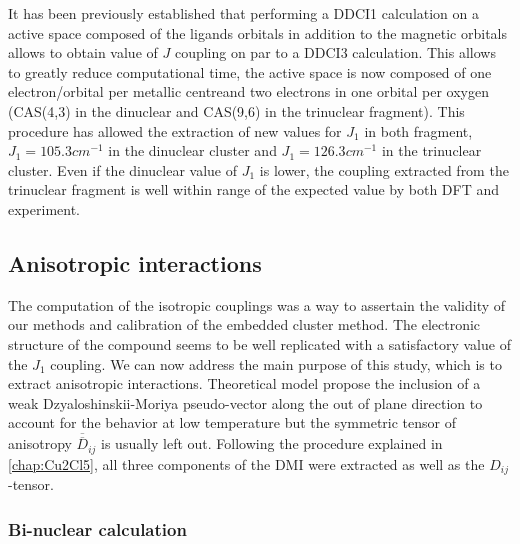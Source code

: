 \documentclass[10pt]{report}
\numberwithin{equation}{section}
\begin{document}
It has been previously established that performing a DDCI1 calculation on a active space composed of the ligands orbitals in addition to the magnetic orbitals allows to obtain value of $J$ coupling on par to a DDCI3 calculation.
This allows to greatly reduce computational time, the active space is now composed of one electron/orbital per metallic centreand two electrons in one orbital per oxygen (CAS(4,3) in the dinuclear and CAS(9,6) in the trinuclear fragment).
This procedure has allowed the extraction of new values for $J_1$ in both fragment, $J_1=105.3 cm^{-1}$ in the dinuclear cluster and $J_1=126.3 cm^{-1}$ in the trinuclear cluster.
Even if the dinuclear value of $J_1$ is lower, the coupling extracted from the trinuclear fragment is well within range of the expected value by both DFT and experiment.




\subsection{Anisotropic interactions}

The computation of the isotropic couplings was a way to assertain the validity of our methods and calibration of the embedded cluster method.
The electronic structure of the compound seems to be well replicated with a satisfactory value of the $J_1$ coupling.
We can now address the main purpose of this study, which is to extract anisotropic interactions.
Theoretical model propose the inclusion of a weak Dzyaloshinskii-Moriya pseudo-vector along the out of plane direction to account for the behavior at low temperature but the symmetric tensor of anisotropy $\overline{\overline{D}}_{ij}$ is usually left out.
Following the procedure explained in \ref{chap:Cu2Cl5}, all three components of the DMI were extracted as well as the $D_{ij}$-tensor.

\subsubsection*{Bi-nuclear calculation}
\end{document}
